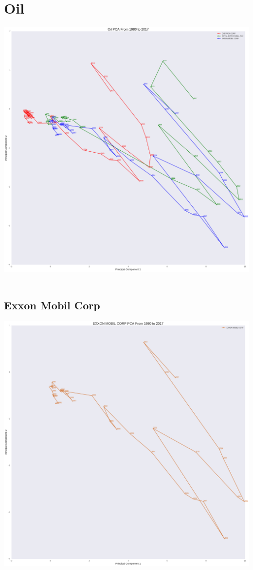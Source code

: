 \section{Oil}
\includegraphics[width=1\textwidth]{./Oil}\\[0.1in] \\
\subsection{Exxon Mobil Corp}
\includegraphics[width=1\textwidth]{./Exxon}\\[0.1in] \\
